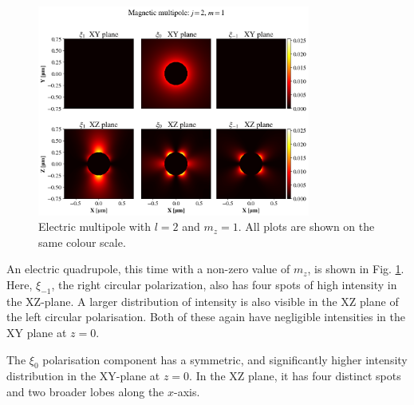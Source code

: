 \begin{figure}
    \includegraphics[trim={0 0cm 0 2cm},clip,width=0.8\textwidth]{Figures/epolej2m1.png}
    \caption{Electric multipole with \( l = 2 \) and \( m_z = 1 \). All plots are shown on the same colour scale.}
    \label{fig:epole}
\end{figure}

An electric quadrupole, this time with a non-zero value of \( m_z \), is shown in Fig. \ref{fig:epole}. Here, \( \xi_{-1} \), the right circular polarization, also has four spots of high intensity in the XZ-plane. A larger distribution of intensity is also visible in the XZ plane of the left circular polarisation. Both of these again have negligible intensities in the XY plane at \( z = 0 \).

The \( \xi_0 \) polarisation component has a symmetric, and significantly higher intensity distribution in the XY-plane at \( z = 0 \). In the XZ plane, it has four distinct spots and two broader lobes along the \( x \)-axis.